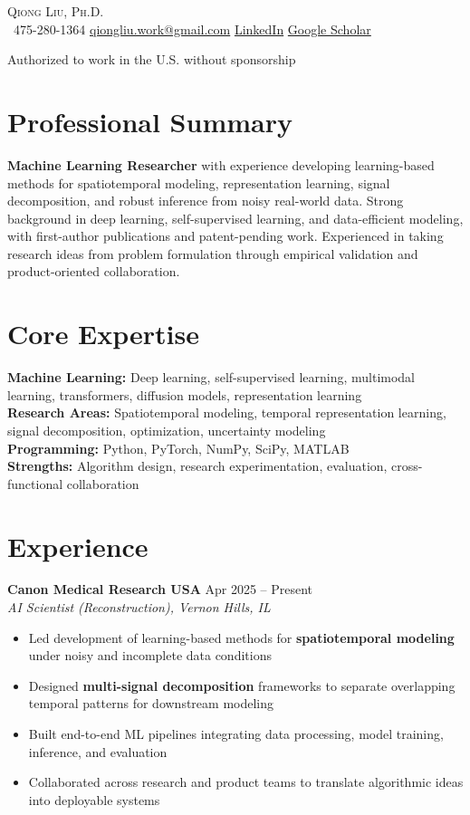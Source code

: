 \begin{center}
{\Huge \scshape Qiong Liu, Ph.D.} \\ \vspace{4pt}
\small
\faPhone\ 475-280-1364 \quad
\href{mailto:qiongliu.work@gmail.com}{qiongliu.work@gmail.com} \quad
\href{https://www.linkedin.com/in/qiong-l-529b23196}{LinkedIn} \quad
\href{https://scholar.google.com/citations?user=SvnpHCkAAAAJ&hl=en}{Google Scholar}

Authorized to work in the U.S. without sponsorship
\end{center}

\section{Professional Summary}
\textbf{Machine Learning Researcher} with experience developing learning-based methods for spatiotemporal modeling, representation learning, signal decomposition, and robust inference from noisy real-world data. Strong background in deep learning, self-supervised learning, and data-efficient modeling, with first-author publications and patent-pending work. Experienced in taking research ideas from problem formulation through empirical validation and product-oriented collaboration.

\section{Core Expertise}
\textbf{Machine Learning:} Deep learning, self-supervised learning, multimodal learning, transformers, diffusion models, representation learning \\
\textbf{Research Areas:} Spatiotemporal modeling, temporal representation learning, signal decomposition, optimization, uncertainty modeling \\
\textbf{Programming:} Python, PyTorch, NumPy, SciPy, MATLAB \\
\textbf{Strengths:} Algorithm design, research experimentation, evaluation, cross-functional collaboration

\section{Experience}
\textbf{Canon Medical Research USA} \hfill Apr 2025 -- Present \\
\textit{AI Scientist (Reconstruction), Vernon Hills, IL}
\begin{itemize}[leftmargin=*]
\item Led development of learning-based methods for \textbf{spatiotemporal modeling} under noisy and incomplete data conditions
\item Designed \textbf{multi-signal decomposition} frameworks to separate overlapping temporal patterns for downstream modeling
\item Built end-to-end ML pipelines integrating data processing, model training, inference, and evaluation
\item Collaborated across research and product teams to translate algorithmic ideas into deployable systems
\end{itemize}

